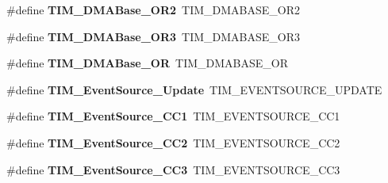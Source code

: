 \begin{DoxyCompactItemize}
\item 
\hypertarget{group___h_a_l___t_i_m___aliased___defines_ga2a1e120dc725fd26c37c29cf97fdcaa9}{\#define {\bfseries T\-I\-M\-\_\-\-D\-M\-A\-Base\-\_\-\-O\-R2}~T\-I\-M\-\_\-\-D\-M\-A\-B\-A\-S\-E\-\_\-\-O\-R2}\label{group___h_a_l___t_i_m___aliased___defines_ga2a1e120dc725fd26c37c29cf97fdcaa9}

\item 
\hypertarget{group___h_a_l___t_i_m___aliased___defines_gae675fedf9cf67bd86a36f17d37f99106}{\#define {\bfseries T\-I\-M\-\_\-\-D\-M\-A\-Base\-\_\-\-O\-R3}~T\-I\-M\-\_\-\-D\-M\-A\-B\-A\-S\-E\-\_\-\-O\-R3}\label{group___h_a_l___t_i_m___aliased___defines_gae675fedf9cf67bd86a36f17d37f99106}

\item 
\hypertarget{group___h_a_l___t_i_m___aliased___defines_gad6a75d19df73bae091a0e649fba7339c}{\#define {\bfseries T\-I\-M\-\_\-\-D\-M\-A\-Base\-\_\-\-O\-R}~T\-I\-M\-\_\-\-D\-M\-A\-B\-A\-S\-E\-\_\-\-O\-R}\label{group___h_a_l___t_i_m___aliased___defines_gad6a75d19df73bae091a0e649fba7339c}

\item 
\hypertarget{group___h_a_l___t_i_m___aliased___defines_ga5bff72fbe94b1ae5a710e402c9868b23}{\#define {\bfseries T\-I\-M\-\_\-\-Event\-Source\-\_\-\-Update}~T\-I\-M\-\_\-\-E\-V\-E\-N\-T\-S\-O\-U\-R\-C\-E\-\_\-\-U\-P\-D\-A\-T\-E}\label{group___h_a_l___t_i_m___aliased___defines_ga5bff72fbe94b1ae5a710e402c9868b23}

\item 
\hypertarget{group___h_a_l___t_i_m___aliased___defines_gaa634c46d4ac521ad16e25be97b487e8a}{\#define {\bfseries T\-I\-M\-\_\-\-Event\-Source\-\_\-\-C\-C1}~T\-I\-M\-\_\-\-E\-V\-E\-N\-T\-S\-O\-U\-R\-C\-E\-\_\-\-C\-C1}\label{group___h_a_l___t_i_m___aliased___defines_gaa634c46d4ac521ad16e25be97b487e8a}

\item 
\hypertarget{group___h_a_l___t_i_m___aliased___defines_ga5e2082a09552acc9c7e9577f104ba15a}{\#define {\bfseries T\-I\-M\-\_\-\-Event\-Source\-\_\-\-C\-C2}~T\-I\-M\-\_\-\-E\-V\-E\-N\-T\-S\-O\-U\-R\-C\-E\-\_\-\-C\-C2}\label{group___h_a_l___t_i_m___aliased___defines_ga5e2082a09552acc9c7e9577f104ba15a}

\item 
\hypertarget{group___h_a_l___t_i_m___aliased___defines_gafeb8538e3b00d938e061e5051f83836b}{\#define {\bfseries T\-I\-M\-\_\-\-Event\-Source\-\_\-\-C\-C3}~T\-I\-M\-\_\-\-E\-V\-E\-N\-T\-S\-O\-U\-R\-C\-E\-\_\-\-C\-C3}\label{group___h_a_l___t_i_m___aliased___defines_gafeb8538e3b00d938e061e5051f83836b}


\end{DoxyCompactItemize}
